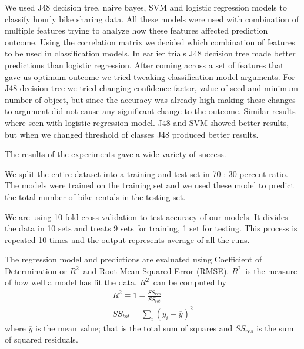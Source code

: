 \documentclass[12pt]{article}
\newcommand{\rtt}{${\mathit R}^2$}
\begin{document}
We used J48 decision tree, naive bayes, SVM and logistic regression models to
classify hourly bike sharing data. All these models were used with combination
of multiple features trying to analyze how these features affected prediction
outcome. Using the correlation matrix we decided which combination of features
to be used in classification models. In earlier trials J48 decision tree made
better predictions than logistic regression. After coming across a set of
features that gave us optimum outcome we tried tweaking classification model
arguments. For J48 decision tree we tried changing confidence factor, value of
seed and minimum number of object, but since the accuracy was already high
making these changes to argument did not cause any significant change to the
outcome. Similar results where seen with logistic regression model. J48 and SVM
showed better results, but when we changed threshold of classes J48 produced
better results.



The results of the experiments gave a wide variety of success.


We split the entire dataset into a training and test set in 70 : 30 percent
ratio. The models were trained on the training set and we used these model to
predict the total number of bike rentals in the testing set.


We are using 10 fold cross validation to test accuracy of our models. It
divides the data in 10 sets and treats 9 sets for training, 1 set for
testing. This process is repeated 10 times and the output represents average of
all the runs.


The regression model and predictions are evaluated using Coefficient of
Determination or \rtt\ and Root Mean Squared Error (RMSE).  \rtt\ is the
measure of how well a model has fit the data. \rtt\ can be computed by
\begin{equation}
\begin{gathered}
R^2 \equiv 1 - \frac{SS_{res}}{SS_{tot}}\\
SS_{tot} = \sum_i(y_i - \overline{y})^2
\end{gathered}
\end{equation}
where $\overline{y}$ is the mean value; that is the total sum of squares and
$SS_{res}$ is the sum of squared residuals.
\end{document}
